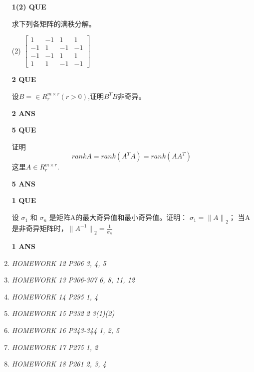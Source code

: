 \documentclass[11pt,letterpaper]{ctexart}
\begin{document}
\begin{enumerate}
\textbf{1(2) QUE}
\bigskip

求下列各矩阵的满秩分解。

(2) $ \begin{bmatrix}
	1 & -1 & 1 & 1 \\
	-1 & 1 & -1 & -1 \\
	-1 & -1 & 1 & 1 \\
	1 & 1 & -1 & -1 
\end{bmatrix}$

\textbf{2 QUE}
\bigskip

设$B = \in R_r^{m \times r}(r > 0)$,证明$B^TB$非奇异。

\textbf{2 ANS}
\bigskip

\textbf{5 QUE}
\bigskip

证明 \[ rankA = rank(A^TA) = rank(AA^T)\]
这里$A \in R_r^{m \times r}$.

\textbf{5 ANS}
\bigskip

\textbf{1 QUE}
\bigskip

设 $\sigma_1$ 和 $\sigma_n$ 是矩阵A的最大奇异值和最小奇异值。证明： $\sigma_1 = {\parallel A \parallel}_2$；
当A是非奇异矩阵时，${\parallel A^{-1} \parallel}_2 = \frac{1}{\sigma_n}$


\textbf{1 ANS}
\bigskip



\item \textit{HOMEWORK 12 {P306 3, 4, 5}}%



\item \textit{HOMEWORK 13 {P306-307 6, 8, 11, 12}}%

\item \textit{HOMEWORK 14 {P295 1, 4}}%


\item \textit{HOMEWORK 15 {P332 2 3(1)(2)}}%

\item \textit{HOMEWORK 16 {P343-344 1, 2, 5}}%


\item \textit{HOMEWORK 17 {P275 1, 2}}%

\item \textit{HOMEWORK 18 {P261 2, 3, 4}}%

\end{enumerate}
\end{document}

